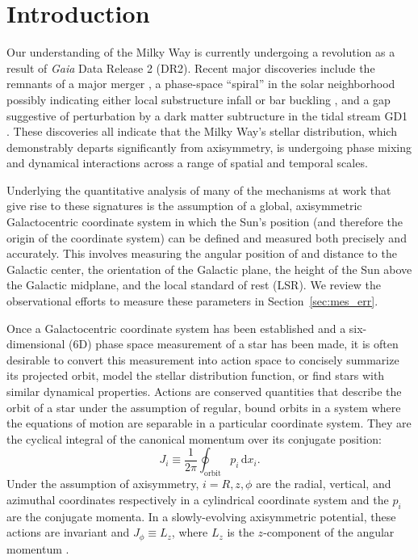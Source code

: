 \documentclass[twocolumn]{aastex62}
\newcommand{\beq}{\begin{equation}}
\newcommand{\eeq}{\end{equation}}
\begin{document}

\section{Introduction} \label{sec:intro}
Our understanding of the Milky Way is currently undergoing a revolution as a
result of \textit{Gaia} Data Release 2 (DR2).  Recent major discoveries
include the remnants of a major merger \citep{2018ApJ...860L..11K,
2018Natur.563...85H, 2018arXiv180704290L, 2019MNRAS.482.3426M}, a phase-space
``spiral'' in the solar neighborhood \citep{2018Natur.561..360A} possibly
indicating either local substructure infall \citep{2018MNRAS.481.1501B,
2018arXiv180800451L} or bar buckling \citep{2018arXiv181109205K}, and a gap
suggestive of perturbation by a dark matter subtructure in the tidal stream
GD1 \citep{2018ApJ...863L..20P, 2018arXiv181103631B}. These discoveries all
indicate that the Milky Way's stellar distribution, which demonstrably departs
significantly from axisymmetry, is undergoing phase mixing and dynamical
interactions across a range of spatial and temporal scales.

Underlying the quantitative analysis of many of the mechanisms at work that
give rise to these signatures is the assumption of a global, axisymmetric
Galactocentric coordinate system \citep{2008gady.book.....B} in which the
Sun's position (and therefore the origin of the coordinate system) can be
defined and measured both precisely and accurately. This involves measuring
the angular position of and distance to the Galactic center, the orientation
of the Galactic plane, the height of the Sun above the Galactic midplane, and
the local standard of rest (LSR). We review the observational efforts to
measure these parameters in Section~\ref{sec:mes_err}.

Once a Galactocentric coordinate system has been established and a
six-dimensional (6D) phase space measurement of a star has been made, it is
often desirable to convert this measurement into action space to concisely
summarize its projected orbit, model the stellar distribution function, or
find stars with similar dynamical properties. Actions are conserved quantities
that describe the orbit of a star under the assumption of regular, bound
orbits in a system where the equations of motion are separable in a particular
coordinate system. They are the cyclical integral of the canonical momentum
over its conjugate position:
\beq\label{eq:actions}
J_i \equiv
\frac{1}{2\pi} \oint_{\text{orbit}}p_i\,\text{d}x_i\text{.}
\eeq
Under the assumption of axisymmetry, $i=R,z,\phi$ are the radial, vertical,
and azimuthal coordinates respectively in a cylindrical coordinate system and
the $p_i$ are the conjugate momenta. In a slowly-evolving axisymmetric
potential, these actions are invariant and $J_{\phi} \equiv L_z$, where $L_z$
is the $z$-component of the angular momentum
\citep{2008gady.book.....B,2014RvMP...86....1S}.
\end{document}
